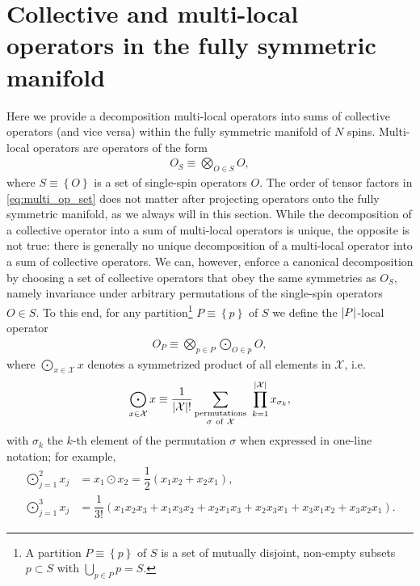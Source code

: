 \documentclass[nofootinbib,notitlepage,11pt]{revtex4-2}
\renewcommand{\t}{\text} %
\newcommand{\f}[2]{\dfrac{#1}{#2}} %
\newcommand{\p}[1]{\left(#1\right)} %
\renewcommand{\set}[1]{\left\{#1\right\}} %
\newcommand{\1}{\mathds{1}}
\newcommand{\X}{\mathcal{X}}
\begin{document}
\section{Collective and multi-local operators in the fully symmetric
  manifold}
\label{sec:multi_to_collective}

Here we provide a decomposition multi-local operators into sums of
collective operators (and vice versa) within the fully symmetric
manifold of $N$ spins.  Multi-local operators are operators of the
form
\begin{align}
  O_S \equiv \bigotimes_{O\in S} O,
  \label{eq:multi_op_set}
\end{align}
where $S\equiv\set{O}$ is a set of single-spin operators $O$.  The
order of tensor factors in \eqref{eq:multi_op_set} does not matter
after projecting operators onto the fully symmetric manifold, as we
always will in this section.  While the decomposition of a collective
operator into a sum of multi-local operators is unique, the opposite
is not true: there is generally no unique decomposition of a
multi-local operator into a sum of collective operators.  We can,
however, enforce a canonical decomposition by choosing a set of
collective operators that obey the same symmetries as $O_S$, namely
invariance under arbitrary permutations of the single-spin operators
$O\in S$.  To this end, for any partition\footnote{A partition
  $P\equiv\set{p}$ of $S$ is a set of mutually disjoint, non-empty
  subsets $p\subset S$ with $\bigcup_{p\in P}p=S$.}  $P\equiv\set{p}$
of $S$ we define the $\abs{P}$-local operator
\begin{align}
  O_P \equiv \bigotimes_{p\in P} \bigodot_{O\in p} O,
\end{align}
where $\bigodot_{x\in\X} x$ denotes a symmetrized product of all
elements in $\X$, i.e.
\begin{align}
  \bigodot_{x\in\X} x
  \equiv \f1{\abs{\X}!}
  \sum_{\substack{\t{permutations}\\\sigma~\t{of}~\X}}
  ~ \prod_{k=1}^{\abs{\X}} x_{\sigma_k},
\end{align}
with $\sigma_k$ the $k$-th element of the permutation $\sigma$ when
expressed in one-line notation; for example,
\begin{align}
  \bigodot_{j=1}^2 x_j &= x_1 \odot x_2 = \f12 \p{x_1x_2 + x_2x_1}, \\
  \bigodot_{j=1}^3 x_j
  &= \f1{3!} \p{x_1x_2x_3 + x_1x_3x_2 + x_2x_1x_3
    + x_2x_3x_1 + x_3x_1x_2 + x_3x_2x_1}.
\end{align}
\end{document}
